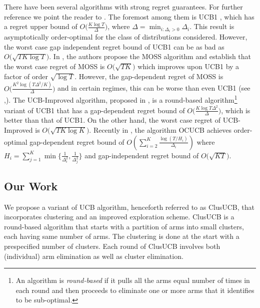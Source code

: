 	There have been several algorithms with strong regret guarantees. For further reference we point the reader to \citet{bubeck2012bandits}. The foremost among them is UCB1 \cite{auer2002finite}, which has a regret upper bound of $O\big(\frac{K\log T}{\Delta}\big)$, where $\Delta = \min_{i:\Delta_i>0} \Delta_i$. This result is asymptotically order-optimal for the class of distributions considered. However, the worst case gap independent regret bound of UCB1  can be as bad as $O \big(\sqrt{TK\log T}\big)$.  In \citet{audibert2009minimax}, the authors propose the MOSS algorithm and establish that the worst case regret of MOSS is $O\big(\sqrt{TK}\big)$ which improves upon UCB1 by a factor of order $\sqrt{\log T}$. However, the gap-dependent regret of MOSS is  $O\big(\frac{K^{2}\log\left(T\Delta^{2}/K\right)}{\Delta}\big)$ and in certain regimes, this can be worse than even UCB1 (see \cite{audibert2009minimax},\cite{lattimore2015optimally}). The UCB-Improved algorithm, proposed in \citet{auer2010ucb}, is a round-based algorithm\footnote{An algorithm is \textit{round-based} if it pulls all the arms equal number of times in each round and then proceeds to eliminate one or more arms that it identifies to be sub-optimal.} variant of UCB1 that 
has a gap-dependent regret bound of $O\big(\frac{K\log T\Delta^{2}}{\Delta}\big)$, which is better than that of UCB1. On the other hand, the worst case regret of UCB-Improved is $O\big(\sqrt{TK\log K}\big)$. Recently in \citet{lattimore2015optimally}, the algorithm OCUCB achieves order-optimal gap-dependent regret bound of $O\left(\sum_{i=2}^{K}\frac{\log\left(T/H_i\right)}{\Delta_i}\right)$ where $H_i=\sum_{j=1}^{K}\min\lbrace \frac{1}{\Delta_i^2},\frac{1}{\Delta_j^2}\rbrace$ and gap-independent regret bound of $O\big( \sqrt{KT}\big)$.
	
\subsection*{Our Work}
We propose a variant of UCB algorithm, henceforth referred to as ClusUCB, that incorporates clustering and an improved exploration scheme. ClusUCB is a round-based algorithm that
starts with a partition of arms into small clusters, each having same number of arms. 
The clustering is done at the start with a prespecified number of clusters. 
Each round of ClusUCB involves both (individual) arm elimination as well as cluster elimination. 



